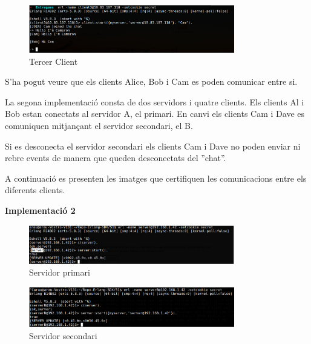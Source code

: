 \documentclass[a4paper, 11pt]{article}
\begin{document}
\begin{figure}[H]
    \centering   
	\includegraphics[width=0.8\textwidth]{figures/Server1_Cam}
    \caption{Tercer Client \label{fig:Impl1_Cam}}	
\end{figure}

S'ha pogut veure que els clients Alice, Bob i Cam es poden comunicar entre si. 


La segona implementació consta de dos servidors i quatre clients. Els clients Al i Bob estan conectats al servidor A, el primari. En canvi els clients Cam i Dave es comuniquen mitjançant el servidor secondari, el B.

Si es desconecta el servidor secondari els clients Cam i Dave no poden enviar ni rebre events de manera que queden desconectats del ''chat''. 

A continuació es presenten les imatges que certifiquen les comunicacions entre els diferents clients. 

\begin{center} 
    \textbf{Implementació 2}
\end{center}

\begin{figure}[H]
	\centering
    \includegraphics[width=0.8\textwidth]{figures/ServerA}
    \caption{Servidor primari \label{fig:firstserver}}    
\end{figure}

\begin{figure}[H]
	\centering
    \includegraphics[width=0.8\textwidth]{figures/ServerB}
    \caption{Servidor secondari \label{fig:secondserver}}    
\end{figure}
\end{document}
